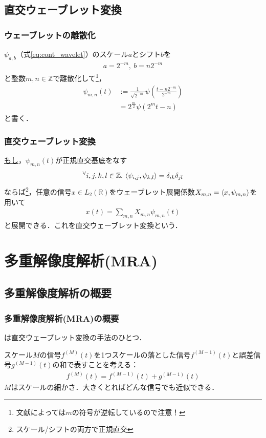 \documentclass[dvipdfmx,graphicx,14pt]{beamer}
\begin{document}
\subsection{直交ウェーブレット変換}

\begin{frame}[c]
    \frametitle{ウェーブレットの離散化}
    $\psi_{a,b}$（式\eqref{eq:cont_wavelet}）のスケール$a$とシフト$b$を
    \begin{align*}
        a = 2^{-m},\ b = n2^{-m}
    \end{align*}
    と整数$m,n\in \mathbb{Z}$で離散化して\footnote{文献によっては$m$の符号が逆転しているので注意！}，
    \begin{align}
        \psi_{m,n}(t) &:= \frac{1}{\sqrt{2^{-m}}} \psi\left( \frac{t - n2^{-m}}{2^{-m}} \right) \nonumber \\
        &= 2^{\frac{m}{2}} \psi(2^{m}t - n)
    \end{align}
    と書く．
\end{frame}

\begin{frame}[c]
    \frametitle{直交ウェーブレット変換}
    \underline{もし}，$\psi_{m,n}(t)$が正規直交基底をなす
    \begin{align*}
        {}^{\forall} i,j,k,l \in \mathbb{Z}.\ \innprod{\psi_{i,j}}{\psi_{k,l}} = \delta_{ik} \delta_{jl}
    \end{align*}
    ならば\footnote{スケール/シフトの両方で正規直交}，任意の信号$x \in L_{2}(\mathbb{R})$をウェーブレット展開係数$X_{m,n} = \langle x, \psi_{m,n} \rangle$を用いて
    \begin{align}
        x(t) = \sum_{m,n} X_{m,n} \psi_{m,n}(t)
    \end{align}
    と展開できる．これを直交ウェーブレット変換という．
\end{frame}

\section{多重解像度解析(MRA)}

\subsection{多重解像度解析の概要}

\begin{frame}[c]
    \frametitle{多重解像度解析(MRA)の概要}
    は直交ウェーブレット変換の手法のひとつ．
    \par
    スケール$M$の信号$f^{(M)}(t)$を1つスケールの落とした信号$f^{(M-1)}(t)$と誤差信号$g^{(M-1)}(t)$の和で表すことを考える：
    \begin{align}
        f^{(M)}(t) = f^{(M-1)}(t) + g^{(M-1)}(t) \label{eq:mra_decomp_onescale}
    \end{align}
    $M$はスケールの細かさ．大きくとればどんな信号でも近似できる．
\end{frame}
\end{document}

